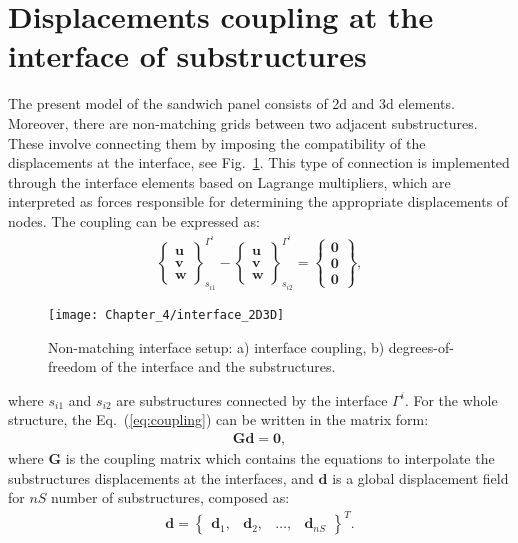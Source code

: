 \section{Displacements coupling at the interface of substructures}
\label{sec:interface}


The present model of the sandwich panel consists of \ac{2d} and \ac{3d} elements. 
Moreover, there are non-matching grids between two adjacent substructures. 
These involve connecting them by imposing the compatibility of the displacements at the interface, see Fig.~\ref{fig:interface}.
This type of connection is implemented through the interface elements based on Lagrange multipliers, which are interpreted as forces responsible for determining the appropriate displacements of nodes.
The coupling can be expressed as:
\begin{eqnarray}
	\left\{\begin{array}{c}
		\textbf{u}\\
		\textbf{v}\\
		\textbf{w}
	\end{array}\right\}_{s_{i1}}^{\Gamma^i}-
	\left\{\begin{array}{c}
		\textbf{u}\\
		\textbf{v}\\
		\textbf{w}
	\end{array}\right\}_{s_{i2}}^{\Gamma^i}=
	\left\{\begin{array}{c}
		\textbf{0}\\
		\textbf{0}\\
		\textbf{0}
	\end{array}\right\},
	\label{eq:coupling}
\end{eqnarray}
\begin{figure}
	\begin{center}
		\texttt{[image: Chapter\_4/interface\_2D3D]}
	\end{center}
	\caption{Non-matching interface setup: a) interface coupling, b) degrees-of-freedom of the interface and the substructures.}
	\label{fig:interface}
\end{figure}
where \(s_{i1}\) and \(s_{i2}\) are substructures connected by the interface \(\Gamma^i\). For the whole structure, the Eq.~(\ref{eq:coupling}) can be written in the matrix form:
\begin{eqnarray}
	\textbf{G}\textbf{d}=\textbf{0},
	\label{eq:cond_disp}
\end{eqnarray}
where \textbf{G} is the coupling matrix which contains the equations to interpolate the substructures displacements at the interfaces, and \(\textbf{d}\) is a global displacement field for \(nS\) number of substructures, composed as:
\begin{eqnarray}
	\textbf{d} = \left\{\begin{array}{cccc}
		\textbf{d}_1, & \textbf{d}_2, &\ldots, & \textbf{d}_{nS}
	\end{array}\right\}^T.
	\label{eq:displacements}
\end{eqnarray}

